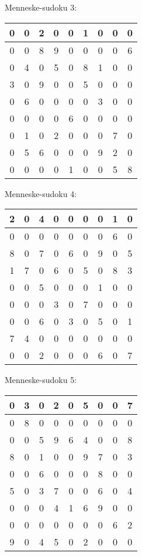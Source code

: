 \documentclass[]{report}
\begin{document}
Menneske-sudoku 3:
\begin{tabular}{|c|c|c||c|c|c||c|c|c|}
\hline
0&0&2&0&0&1&0&0&0 \\ \hline
0&0&8&9&0&0&0&0&6\\ \hline
0&4&0&5&0&8&1&0&0\\ \hline \hline
3&0&9&0&0&5&0&0&0\\ \hline
0&6&0&0&0&0&3&0&0\\ \hline
0&0&0&0&6&0&0&0&0\\ \hline \hline
0&1&0&2&0&0&0&7&0\\ \hline
0&5&6&0&0&0&9&2&0\\ \hline
0&0&0&0&1&0&0&5&8\\ \hline
\end{tabular}

Menneske-sudoku 4:
\begin{tabular}{|c|c|c||c|c|c||c|c|c|}
\hline
2&0&4&0&0&0&0&1&0 \\ \hline
0&0&0&0&0&0&0&6&0\\ \hline
8&0&7&0&6&0&9&0&5\\ \hline \hline
1&7&0&6&0&5&0&8&3\\ \hline
0&0&5&0&0&0&1&0&0\\ \hline
0&0&0&3&0&7&0&0&0\\ \hline \hline
0&0&6&0&3&0&5&0&1\\ \hline
7&4&0&0&0&0&0&0&0\\ \hline
0&0&2&0&0&0&6&0&7\\ \hline
\end{tabular}

Menneske-sudoku 5:
\begin{tabular}{|c|c|c||c|c|c||c|c|c|}
\hline
0&3&0&2&0&5&0&0&7\\ \hline
0&8&0&0&0&0&0&0&0\\\hline
0&0&5&9&6&4&0&0&8\\\hline\hline
8&0&1&0&0&9&7&0&3\\\hline
0&0&6&0&0&0&8&0&0\\\hline
5&0&3&7&0&0&6&0&4\\\hline\hline
0&0&0&4&1&6&9&0&0\\\hline
0&0&0&0&0&0&0&6&2\\\hline
9&0&4&5&0&2&0&0&0\\ \hline
\end{tabular}
\end{document}
